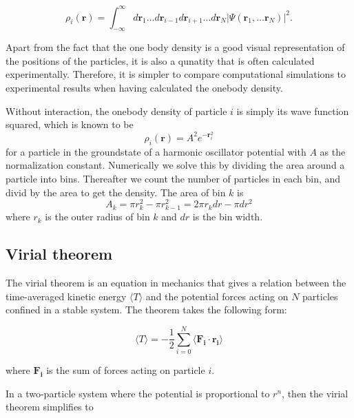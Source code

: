 \documentclass[norsk,a4paper,12pt]{article}
\begin{document}
\begin{equation}
\label{eq:onebody_density}
\rho_i(\boldsymbol{r})=\int_{-\infty}^{\infty}d\boldsymbol{r}_1\hdots d\boldsymbol{r}_{i-1}d\boldsymbol{r}_{i+1}\hdots d\boldsymbol{r}_N |\Psi(\boldsymbol{r}_1,\hdots \boldsymbol{r}_N)|^2.
\end{equation}

Apart from the fact that the one body density is a good visual representation of the positions of the particles, it is also a qunatity that is often calculated experimentally. Therefore, it is simpler to compare computational simulations to  experimental results when having calculated the onebody density.

Without interaction, the onebody density of particle $i$ is simply its wave function squared, which is known to be
\begin{equation}
\rho_i(\boldsymbol{r})=A^2e^{-\boldsymbol{r}_i^2}
\end{equation}
for a particle in the groundstate of a harmonic oscillator potential with $A$ as the normalization constant. Numerically we solve this by dividing the area around a particle into bins. Thereafter we count the number of particles in each bin, and divid by the area to get the density. The area of bin $k$ is
\begin{equation}
A_k=\pi r_k^2-\pi r_{k-1}^2=2\pi r_kdr-\pi dr^2
\end{equation}
where $r_k$ is the outer radius of bin $k$ and $dr$ is the bin width.

\subsection{Virial theorem}
The virial theorem is an equation in mechanics that gives a relation between the time-averaged kinetic energy $\langle T \rangle$ and the potential forces acting on $N$ particles confined in a stable system. The theorem takes the following form:

\begin{equation}
\langle T \rangle = - \frac{1}{2} \sum_{i=0}^N \langle \boldsymbol{F_i} \cdot \boldsymbol{r_i} \rangle 
\end{equation}

where $\boldsymbol{F_i}$ is the sum of forces acting on particle $i$.\par 
\vspace{3mm}

In a two-particle system where the potential is proportional to $r^n$, then the virial theorem simplifies to 
\end{document}
